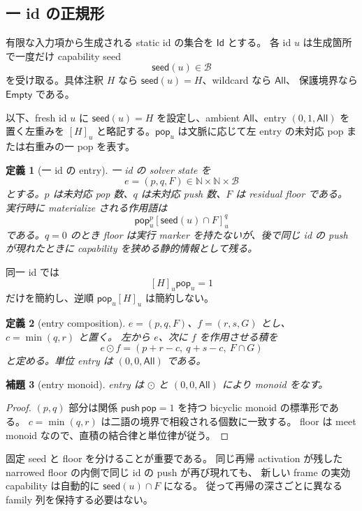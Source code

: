 \documentclass[uplatex,dvipdfmx,a4paper,10.5pt]{jsarticle}
\theoremstyle{jpplain}
\newtheorem{definition}{定義}[section]
\newtheorem{lemma}[definition]{補題}
\newcommand{\Id}{\mathsf{Id}}
\newcommand{\Nat}{\mathbb N}
\newcommand{\All}{\mathsf{All}}
\newcommand{\Empty}{\mathsf{Empty}}
\newcommand{\takeop}[2]{[#1]_{#2}}
\newcommand{\popop}[1]{\mathsf{pop}_{#1}}
\newcommand{\Caps}{\mathcal B}
\newcommand{\seedcap}{\mathsf{seed}}
\begin{document}
\subsection{一 id の正規形}

有限な入力項から生成される static id の集合を $\Id$ とする。
各 id $u$ は生成箇所で一度だけ capability seed
\[
  \seedcap(u)\in\Caps
\]
を受け取る。具体注釈 $H$ なら $\seedcap(u)=H$、wildcard なら $\All$、
保護境界なら $\Empty$ である。

以下、fresh id $u$ に $\seedcap(u)=H$ を設定し、ambient $\All$、entry $(0,1,\All)$ を置く左重みを
$\takeop{H}{u}$ と略記する。$\popop{u}$ は文脈に応じて左 entry の未対応 pop または右重みの一 pop を表す。

\begin{definition}[一 id の entry]
一 id の solver state を
\[
  e=(p,q,F)\in\Nat\times\Nat\times\Caps
\]
とする。$p$ は未対応 pop 数、$q$ は未対応 push 数、$F$ は residual floor である。
実行時に materialize される作用語は
\[
  \popop{u}^{p}\takeop{\seedcap(u)\cap F}{u}^{q}
\]
である。$q=0$ のとき floor は実行 marker を持たないが、後で同じ id の push が現れたときに
capability を狭める静的情報として残る。
\end{definition}

同一 id では
\[
  \takeop{H}{u}\popop{u}=1
\]
だけを簡約し、逆順 $\popop{u}\takeop{H}{u}$ は簡約しない。

\begin{definition}[entry composition]
$e=(p,q,F)$、$f=(r,s,G)$ とし、$c=\min(q,r)$ と置く。
左から $e$、次に $f$ を作用させる積を
\[
  e\odot f=(p+r-c,\ q+s-c,\ F\cap G)
\]
と定める。単位 entry は $(0,0,\All)$ である。
\end{definition}

\begin{lemma}[entry monoid]
entry は $\odot$ と $(0,0,\All)$ により monoid をなす。
\end{lemma}

\begin{proof}
$(p,q)$ 部分は関係 $\mathsf{push}\,\mathsf{pop}=1$ を持つ bicyclic monoid の標準形である。
$c=\min(q,r)$ は二語の境界で相殺される個数に一致する。
floor は meet monoid なので、直積の結合律と単位律が従う。
\end{proof}

固定 seed と floor を分けることが重要である。
同じ再帰 activation が残した narrowed floor の内側で同じ id の push が再び現れても、
新しい frame の実効 capability は自動的に $\seedcap(u)\cap F$ になる。
従って再帰の深さごとに異なる family 列を保持する必要はない。
\end{document}
